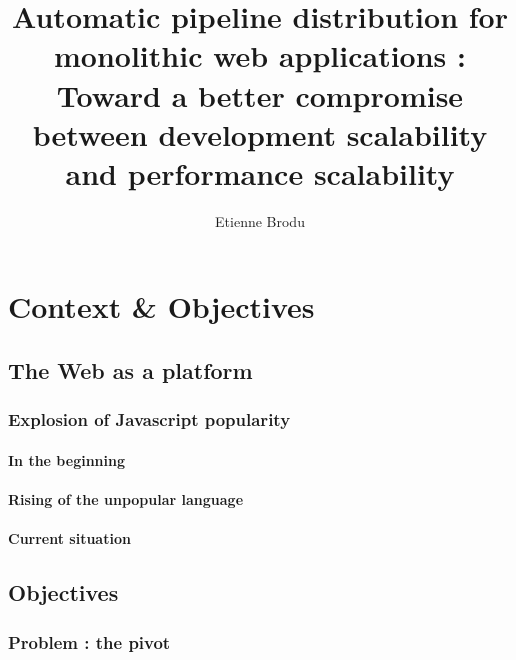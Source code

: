 \documentclass[12pt]{report}
\begin{document}
\title{Automatic pipeline distribution for monolithic web applications : Toward a better compromise between development scalability and performance scalability }
\author{Etienne Brodu}

\maketitle



\tableofcontents


% 

\chapter{Context \& Objectives}
  \section{The Web as a platform}


    \subsection{Explosion of Javascript popularity}
      \subsubsection{In the beginning}
      \subsubsection{Rising of the unpopular language}
      \subsubsection{Current situation}


  \section{Objectives}

    \subsection{Problem : the pivot}
\end{document}
